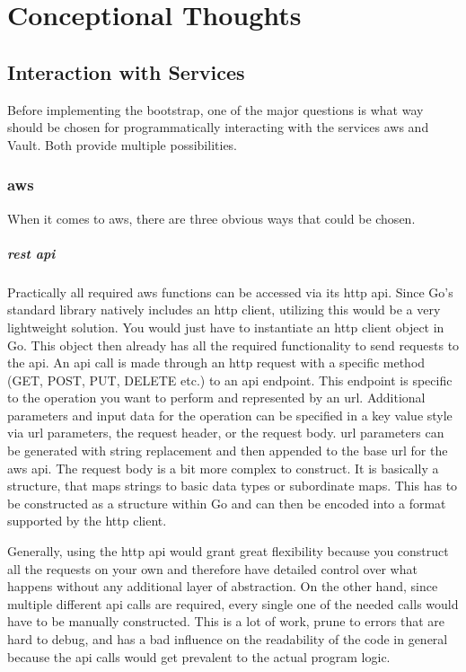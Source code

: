 \chapter{Conceptional Thoughts}
\label{sec:concept}

\section{Interaction with Services}
Before implementing the bootstrap, one of the major questions is what way should be chosen for programmatically interacting with the services \ac{aws} and Vault.
Both provide multiple possibilities.

\subsection{\ac{aws}}
When it comes to \ac{aws}, there are three obvious ways that could be chosen.

\paragraph{\acs{rest} \ac{api}}
Practically all required \ac{aws} functions can be accessed via its \ac{http} \ac{api}.
Since Go's standard library natively includes an \ac{http} client, utilizing this would be a very lightweight solution.
You would just have to instantiate an \ac{http} client object in Go.
This object then already has all the required functionality to send requests to the \ac{api}.
An \ac{api} call is made through an \ac{http} request with a specific method (GET, POST, PUT, DELETE etc.) to an \ac{api} endpoint.
This endpoint is specific to the operation you want to perform and represented by an \ac{url}.
Additional parameters and input data for the operation can be specified in a key value style via \ac{url} parameters, the request header, or the request body.
\ac{url} parameters can be generated with string replacement and then appended to the base \ac{url} for the \ac{aws} \ac{api}.
The request body is a bit more complex to construct.
It is basically a structure, that maps strings to basic data types or subordinate maps.
This has to be constructed as a structure within Go and can then be encoded into a format supported by the \ac{http} client.

Generally, using the \ac{http} \ac{api} would grant great flexibility because you construct all the requests on your own and therefore have detailed control over what happens without any additional layer of abstraction.
On the other hand, since multiple different \ac{api} calls are required, every single one of the needed calls would have to be manually constructed.
This is a lot of work, prune to errors that are hard to debug, and has a bad influence on the readability of the code in general because the \ac{api} calls would get prevalent to the actual program logic.

